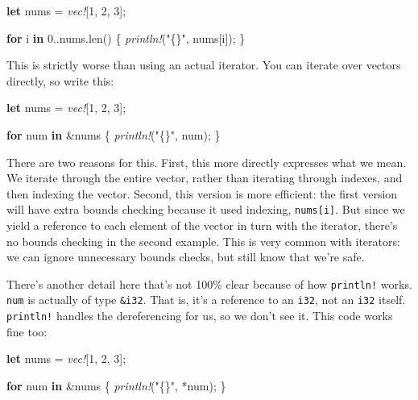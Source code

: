 \documentclass[a4paper,]{book}
\newenvironment{Shaded}{\begin{snugshade}}{\end{snugshade}}
\newcommand{\KeywordTok}[1]{\textcolor[rgb]{0.13,0.29,0.53}{\textbf{{#1}}}}
\newcommand{\DecValTok}[1]{\textcolor[rgb]{0.00,0.00,0.81}{{#1}}}
\newcommand{\StringTok}[1]{\textcolor[rgb]{0.31,0.60,0.02}{{#1}}}
\newcommand{\PreprocessorTok}[1]{\textcolor[rgb]{0.56,0.35,0.01}{\textit{{#1}}}}
\newcommand{\NormalTok}[1]{{#1}}
\begin{document}
\begin{Shaded}
\begin{Highlighting}[]
\KeywordTok{let} \NormalTok{nums = }\PreprocessorTok{vec!}\NormalTok{[}\DecValTok{1}\NormalTok{, }\DecValTok{2}\NormalTok{, }\DecValTok{3}\NormalTok{];}

\KeywordTok{for} \NormalTok{i }\KeywordTok{in} \DecValTok{0.}\NormalTok{.nums.len() \{}
    \PreprocessorTok{println!}\NormalTok{(}\StringTok{"\{\}"}\NormalTok{, nums[i]);}
\NormalTok{\}}
\end{Highlighting}
\end{Shaded}

This is strictly worse than using an actual iterator. You can iterate
over vectors directly, so write this:

\begin{Shaded}
\begin{Highlighting}[]
\KeywordTok{let} \NormalTok{nums = }\PreprocessorTok{vec!}\NormalTok{[}\DecValTok{1}\NormalTok{, }\DecValTok{2}\NormalTok{, }\DecValTok{3}\NormalTok{];}

\KeywordTok{for} \NormalTok{num }\KeywordTok{in} \NormalTok{&nums \{}
    \PreprocessorTok{println!}\NormalTok{(}\StringTok{"\{\}"}\NormalTok{, num);}
\NormalTok{\}}
\end{Highlighting}
\end{Shaded}

There are two reasons for this. First, this more directly expresses what
we mean. We iterate through the entire vector, rather than iterating
through indexes, and then indexing the vector. Second, this version is
more efficient: the first version will have extra bounds checking
because it used indexing, \texttt{nums{[}i{]}}. But since we yield a
reference to each element of the vector in turn with the iterator,
there's no bounds checking in the second example. This is very common
with iterators: we can ignore unnecessary bounds checks, but still know
that we're safe.

There's another detail here that's not 100\% clear because of how
\texttt{println!} works. \texttt{num} is actually of type
\texttt{\&i32}. That is, it's a reference to an \texttt{i32}, not an
\texttt{i32} itself. \texttt{println!} handles the dereferencing for us,
so we don't see it. This code works fine too:

\begin{Shaded}
\begin{Highlighting}[]
\KeywordTok{let} \NormalTok{nums = }\PreprocessorTok{vec!}\NormalTok{[}\DecValTok{1}\NormalTok{, }\DecValTok{2}\NormalTok{, }\DecValTok{3}\NormalTok{];}

\KeywordTok{for} \NormalTok{num }\KeywordTok{in} \NormalTok{&nums \{}
    \PreprocessorTok{println!}\NormalTok{(}\StringTok{"\{\}"}\NormalTok{, *num);}
\NormalTok{\}}
\end{Highlighting}
\end{Shaded}
\end{document}
